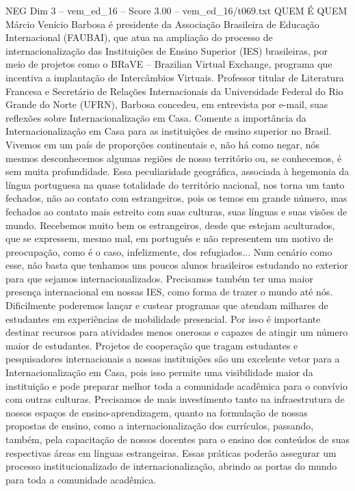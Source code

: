 \begin{textsample}{NEG Dim 3 – vem\_ed\_16 – Score 3.00 – vem\_ed\_16/t069.txt}  \label{ex:f3_neg_018}
QUEM É QUEM Márcio Venício Barbosa é presidente da Associação Brasileira de Educação Internacional (FAUBAI), que atua na ampliação do processo de internacionalização das Instituições de Ensino Superior (IES) brasileiras, por meio de projetos como o BRaVE – Brazilian Virtual Exchange, programa que incentiva a implantação de Intercâmbios Virtuais.
Professor titular de Literatura Francesa e Secretário de Relações Internacionais da Universidade Federal do Rio Grande do Norte (UFRN), Barbosa concedeu, em entrevista por e-mail, suas reflexões sobre Internacionalização em Casa.
Comente a importância da Internacionalização em Casa para as instituições de ensino superior no Brasil.
Vivemos em um país de proporções continentais e, não há como negar, nós mesmos desconhecemos algumas regiões de nosso território ou, se conhecemos, é sem muita profundidade.
Essa peculiaridade geográfica, associada à hegemonia da língua portuguesa na quase totalidade do território nacional, nos torna um tanto fechados, não ao contato com estrangeiros, pois os temos em grande número, mas fechados ao contato mais estreito com suas culturas, suas línguas e suas visões de mundo.
Recebemos muito bem os estrangeiros, desde que estejam aculturados, que se expressem, mesmo mal, em português e não representem um motivo de preocupação, como é o caso, infelizmente, dos refugiados...
Num cenário como esse, não basta que tenhamos uns poucos alunos brasileiros estudando no exterior para que sejamos internacionalizados.
Precisamos também ter uma maior presença internacional em nossas IES, como forma de trazer o mundo até nós.
Dificilmente poderemos lançar e custear programas que atendam milhares de estudantes em experiências de mobilidade presencial.
Por isso é importante destinar recursos para atividades menos onerosas e capazes de atingir um número maior de estudantes.
Projetos de cooperação que tragam estudantes e pesquisadores internacionais a nossas instituições são um excelente vetor para a Internacionalização em Casa, pois isso permite uma visibilidade maior da instituição e pode preparar melhor toda a comunidade acadêmica para o convívio com outras culturas.
Precisamos de mais investimento tanto na infraestrutura de nossos espaços de ensino-aprendizagem, quanto na formulação de nossas propostas de ensino, como a internacionalização dos currículos, passando, também, pela capacitação de nossos docentes para o ensino dos conteúdos de suas respectivas áreas em línguas estrangeiras.
Essas práticas poderão assegurar um processo institucionalizado de internacionalização, abrindo as portas do mundo para toda a comunidade acadêmica.

\end{textsample}
